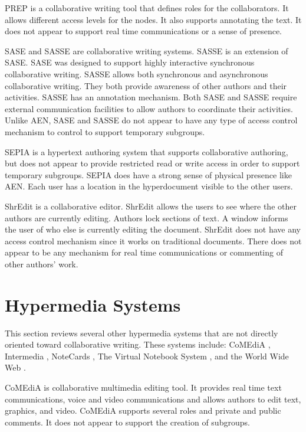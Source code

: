 PREP is a collaborative writing tool that defines roles for the
collaborators.  It allows different access levels for the nodes.  It also
supports annotating the text.  It does not appear to support real time
communications or a sense of presence.

SASE and SASSE are collaborative writing systems.  SASSE is an extension
of SASE.  SASE was designed to support highly interactive synchronous
collaborative writing.  SASSE allows both synchronous and asynchronous
collaborative writing.  They both provide awareness of other authors
and their activities.  SASSE has an annotation mechanism.  Both SASE
and SASSE require external communication facilities to allow authors to
coordinate their activities.  Unlike AEN, SASE and SASSE do not appear
to have any type of access control mechanism to control to support
temporary subgroups.

SEPIA is a hypertext authoring system that supports collaborative
authoring, but does not appear to provide restricted read or write
access in order to support temporary subgroups.  SEPIA does have a
strong sense of physical presence like AEN.  Each user has a location
in the hyperdocument visible to the other users.

ShrEdit is a collaborative editor.  ShrEdit allows the users to see where the
other authors are currently editing.  Authors lock sections of text.  A
window informs the user of who else is currently editing the document.
ShrEdit does not have any access control mechanism since it works on
traditional documents.  There does not appear to be any mechanism for
real time communications or commenting of other authors' work.


\section{Hypermedia Systems}
\label{sec:hypermedia}

This section reviews several other hypermedia systems that are not directly
oriented toward collaborative writing.  These systems include: CoMEdiA
\cite{Santos92a,Santos92b,Santos93a,Santos93b}, Intermedia
\cite{Conklin87},  NoteCards \cite{Halasz87},  The
Virtual Notebook System \cite{Shipman89}, and the World Wide Web
\cite{Berners-Lee94}.

CoMEdiA is collaborative multimedia editing tool.  It provides real
time text communications, voice and video communications and allows authors to
edit text, graphics, and video.  CoMEdiA supports several roles and private
and public comments.  It does not appear to support the creation of
subgroups. 

